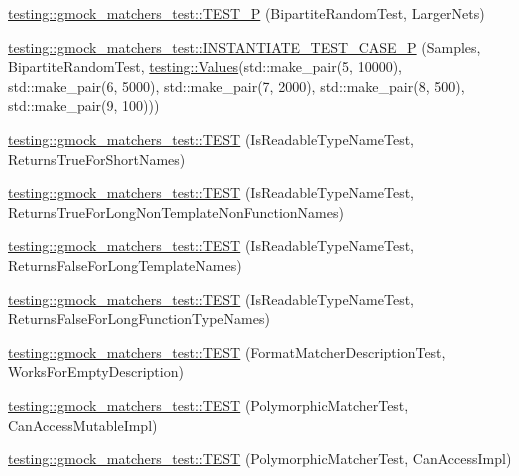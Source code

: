 \begin{DoxyCompactItemize}
\item 
\mbox{\hyperlink{namespacetesting_1_1gmock__matchers__test_ace6351a5a34b746491458140b06534ed}{testing\+::gmock\+\_\+matchers\+\_\+test\+::\+T\+E\+S\+T\+\_\+P}} (Bipartite\+Random\+Test, Larger\+Nets)
\item 
\mbox{\hyperlink{namespacetesting_1_1gmock__matchers__test_a857f48ffb1fc6f5ce61aec79b5c94da8}{testing\+::gmock\+\_\+matchers\+\_\+test\+::\+I\+N\+S\+T\+A\+N\+T\+I\+A\+T\+E\+\_\+\+T\+E\+S\+T\+\_\+\+C\+A\+S\+E\+\_\+P}} (Samples, Bipartite\+Random\+Test, \mbox{\hyperlink{namespacetesting_a8209ef59db08b8ad4beed30d8d6e6a88}{testing\+::\+Values}}(std\+::make\+\_\+pair(5, 10000), std\+::make\+\_\+pair(6, 5000), std\+::make\+\_\+pair(7, 2000), std\+::make\+\_\+pair(8, 500), std\+::make\+\_\+pair(9, 100)))
\item 
\mbox{\hyperlink{namespacetesting_1_1gmock__matchers__test_aef0bf5f855b1e75c63ec45408b5a23ba}{testing\+::gmock\+\_\+matchers\+\_\+test\+::\+T\+E\+ST}} (Is\+Readable\+Type\+Name\+Test, Returns\+True\+For\+Short\+Names)
\item 
\mbox{\hyperlink{namespacetesting_1_1gmock__matchers__test_a839515535e3e75d4f80ba6ae8f7347ec}{testing\+::gmock\+\_\+matchers\+\_\+test\+::\+T\+E\+ST}} (Is\+Readable\+Type\+Name\+Test, Returns\+True\+For\+Long\+Non\+Template\+Non\+Function\+Names)
\item 
\mbox{\hyperlink{namespacetesting_1_1gmock__matchers__test_ad1630d47de9f4fcdc00ab4962eaeea05}{testing\+::gmock\+\_\+matchers\+\_\+test\+::\+T\+E\+ST}} (Is\+Readable\+Type\+Name\+Test, Returns\+False\+For\+Long\+Template\+Names)
\item 
\mbox{\hyperlink{namespacetesting_1_1gmock__matchers__test_a30516b1c70e14132d1d87ab08b96aa2f}{testing\+::gmock\+\_\+matchers\+\_\+test\+::\+T\+E\+ST}} (Is\+Readable\+Type\+Name\+Test, Returns\+False\+For\+Long\+Function\+Type\+Names)
\item 
\mbox{\hyperlink{namespacetesting_1_1gmock__matchers__test_ae104f652fab7d1b3c3873f6987401481}{testing\+::gmock\+\_\+matchers\+\_\+test\+::\+T\+E\+ST}} (Format\+Matcher\+Description\+Test, Works\+For\+Empty\+Description)
\item 
\mbox{\hyperlink{namespacetesting_1_1gmock__matchers__test_ae29925e94a9396fe3c7fab6efaff8d8a}{testing\+::gmock\+\_\+matchers\+\_\+test\+::\+T\+E\+ST}} (Polymorphic\+Matcher\+Test, Can\+Access\+Mutable\+Impl)
\item 
\mbox{\hyperlink{namespacetesting_1_1gmock__matchers__test_a918a64c4594ef6b30f53d735c2e6e6ac}{testing\+::gmock\+\_\+matchers\+\_\+test\+::\+T\+E\+ST}} (Polymorphic\+Matcher\+Test, Can\+Access\+Impl)

\end{DoxyCompactItemize}
